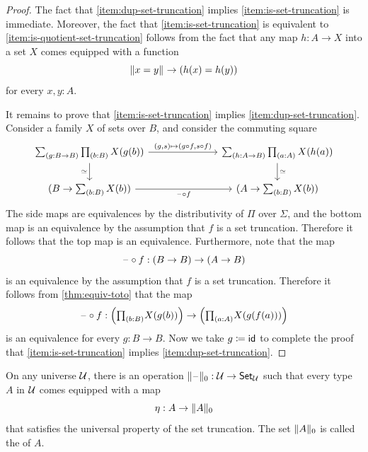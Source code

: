\begin{proof}
  The fact that \ref{item:dup-set-truncation} implies \ref{item:is-set-truncation} is immediate. Moreover, the fact that \ref{item:is-set-truncation} is equivalent to \ref{item:is-quotient-set-truncation} follows from the fact that any map $h:A\to X$ into a set $X$ comes equipped with a function
  \begin{equation*}
    \brck{x=y}\to (h(x)=h(y))
  \end{equation*}
  for every $x,y:A$. 
  
  It remains to prove that \ref{item:is-set-truncation} implies \ref{item:dup-set-truncation}. Consider a family $X$ of sets over $B$, and consider the commuting square
  \begin{equation*}
    \begin{tikzcd}[column sep=7em]
      \sm{g:B\to B}\prd{b:B}X(g(b)) \arrow[d,swap,"\simeq"] \arrow[r,"{(g,s)\mapsto (g\circ f,s\circ f)}"] & \sm{h:A\to B}\prd{a:A}X(h(a)) \arrow[d,"\simeq"] \\
      (B\to\sm{b:B}X(b)) \arrow[r,swap,"\blank\circ f"] & (A\to\sm{b:B}X(b))
    \end{tikzcd}
  \end{equation*}
  The side maps are equivalences by the distributivity of $\Pi$ over $\Sigma$, and the bottom map is an equivalence by the assumption that $f$ is a set truncation. Therefore it follows that the top map is an equivalence. Furthermore, note that the map
  \begin{equation*}
    \blank\circ f : (B\to B)\to (A\to B)
  \end{equation*}
  is an equivalence by the assumption that $f$ is a set truncation. Therefore it follows from \cref{thm:equiv-toto} that the map
  \begin{equation*}
    \blank\circ f : \Big(\prd{b:B}X(g(b))\Big)\to \Big(\prd{a:A}X(g(f(a)))\Big)
  \end{equation*}
  is an equivalence for every $g:B\to B$. Now we take $g\defeq \idfunc$ to complete the proof that \ref{item:is-set-truncation} implies \ref{item:dup-set-truncation}.
\end{proof}

\begin{cor}
  On any universe $\UU$, there is an operation $\trunc{0}{\blank}:\UU\to\Set_\UU$ such that every type $A$ in $\UU$ comes equipped with a map
  \begin{equation*}
    \eta:A\to\trunc{0}{A}
  \end{equation*}
  that satisfies the universal property of the set truncation. The set $\trunc{0}{A}$ is called the  of $A$.
\end{cor}

